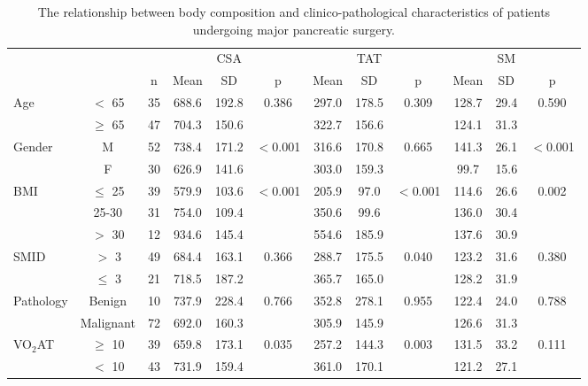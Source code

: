 \begin{sidewaystable}[p]
	\caption{The relationship between body composition and clinico-pathological characteristics of patients undergoing major pancreatic surgery.}
	\label{table:bc_clinical_old}
	\setlength{\tabcolsep}{9pt} %
	\centering
	\begin{tabular}{|l c c | c c c | c c c | c c c|}
		\hline
		           &           &    &       & CSA   &          &       & TAT   &          &       & SM   &  \\
		           &           & n  & Mean  & SD    & p        & Mean  & SD    & p        & Mean  & SD   & p        \\ \hline
		Age        & $<$ 65    & 35 & 688.6 & 192.8 & 0.386    & 297.0 & 178.5 & 0.309    & 128.7 & 29.4 & 0.590    \\
		           & $\geq$ 65 & 47 & 704.3 & 150.6 &          & 322.7 & 156.6 &          & 124.1 & 31.3 &  \\
		Gender     & M         & 52 & 738.4 & 171.2 & $<$0.001 & 316.6 & 170.8 & 0.665    & 141.3 & 26.1 & $<$0.001 \\
		           & F         & 30 & 626.9 & 141.6 &          & 303.0 & 159.3 &          & 99.7  & 15.6 &  \\
		BMI        & $\leq$ 25 & 39 & 579.9 & 103.6 & $<$0.001 & 205.9 & 97.0  & $<$0.001 & 114.6 & 26.6 & 0.002    \\
		           & 25-30     & 31 & 754.0 & 109.4 &          & 350.6 & 99.6  &          & 136.0 & 30.4 &  \\
		           & $>$ 30    & 12 & 934.6 & 145.4 &          & 554.6 & 185.9 &          & 137.6 & 30.9 &  \\
		SMID       & $>$ 3     & 49 & 684.4 & 163.1 & 0.366    & 288.7 & 175.5 & 0.040    & 123.2 & 31.6 & 0.380    \\
		           & $\leq$ 3  & 21 & 718.5 & 187.2 &          & 365.7 & 165.0 &          & 128.2 & 31.9 &  \\
		Pathology  & Benign    & 10 & 737.9 & 228.4 & 0.766    & 352.8 & 278.1 & 0.955    & 122.4 & 24.0 & 0.788    \\
		           & Malignant & 72 & 692.0 & 160.3 &          & 305.9 & 145.9 &          & 126.6 & 31.3 &  \\
		VO$_2$AT   & $\geq$ 10 & 39 & 659.8 & 173.1 & 0.035    & 257.2 & 144.3 & 0.003    & 131.5 & 33.2 & 0.111    \\
		           & $<$ 10    & 43 & 731.9 & 159.4 &          & 361.0 & 170.1 &          & 121.2 & 27.1 &  \\

\end{tabular}
\end{sidewaystable}
